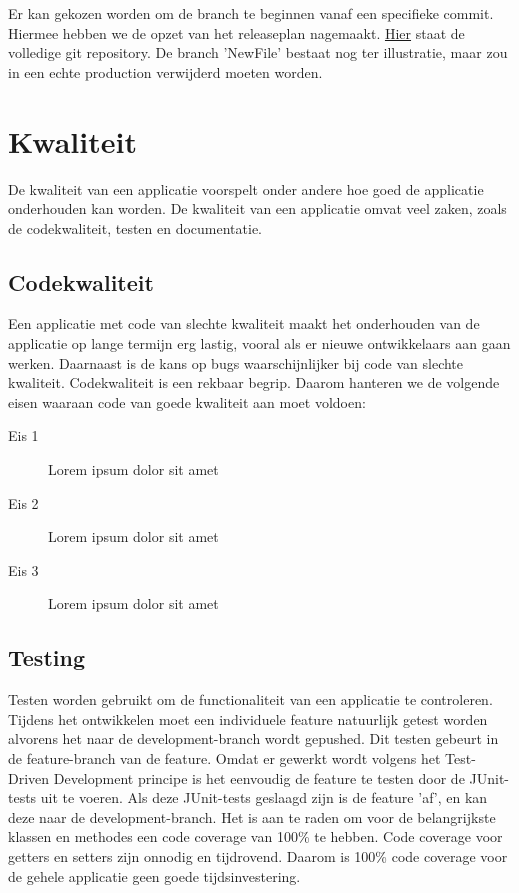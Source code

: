 \documentclass[12pt]{article}
\begin{document}
Er kan gekozen worden om de branch te beginnen vanaf een specifieke commit. Hiermee hebben we de opzet van het releaseplan nagemaakt.
\href{https://github.com/kndschilders/ReleasePlanGitTest}{Hier}
staat de volledige git repository. De branch 'NewFile' bestaat nog ter illustratie, maar zou in een echte production verwijderd moeten worden.

\pagebreak
\section{Kwaliteit}
De kwaliteit van een applicatie voorspelt onder andere hoe goed de applicatie onderhouden kan worden. De kwaliteit van een applicatie omvat veel zaken, zoals de codekwaliteit, testen en documentatie.

\subsection{Codekwaliteit}
Een applicatie met code van slechte kwaliteit maakt het onderhouden van de applicatie op lange termijn erg lastig, vooral als er nieuwe ontwikkelaars aan gaan werken. Daarnaast is de kans op bugs waarschijnlijker bij code van slechte kwaliteit.
\newline
Codekwaliteit is een rekbaar begrip. Daarom hanteren we de volgende eisen waaraan code van goede kwaliteit aan moet voldoen:

\begin{description}
	\item[Eis 1] Lorem ipsum dolor sit amet
	\item[Eis 2] Lorem ipsum dolor sit amet
	\item[Eis 3] Lorem ipsum dolor sit amet
\end{description}

\subsection{Testing}
Testen worden gebruikt om de functionaliteit van een applicatie te controleren. Tijdens het ontwikkelen moet een individuele feature natuurlijk getest worden alvorens het naar de development-branch wordt gepushed. Dit testen gebeurt in de feature-branch van de feature. Omdat er gewerkt wordt volgens het Test-Driven Development principe is het eenvoudig de feature te testen door de JUnit-tests uit te voeren. Als deze JUnit-tests geslaagd zijn is de feature 'af', en kan deze naar de development-branch.
\newline
Het is aan te raden om voor de belangrijkste klassen en methodes een code coverage van 100\% te hebben. Code coverage voor getters en setters zijn onnodig en tijdrovend. Daarom is 100\% code coverage voor de gehele applicatie geen goede tijdsinvestering.
\end{document}
